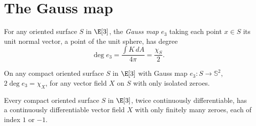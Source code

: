 \section{The Gauss map}
For any oriented surface \(S\) in \(\E[3]\), the \emph{Gauss map} \(e_3\) taking each point \(x \in S\) its unit normal vector, a point of the unit sphere, has degree
\[
\deg e_3 = \frac{\int K \, dA}{4 \pi}=\frac{\chi_S}{2}.
\]
\begin{theorem}
On any compact oriented surface \(S\) in \(\E[3]\) with Gauss map \(e_3 \colon S \to \mathbb{S}^2\), \(2 \deg e_3 = \chi_X\), for any vector field \(X\) on \(S\) with only isolated zeroes.
\end{theorem}
\begin{theorem}\label{theorem:exists.decent.vf}
Every compact oriented surface \(S\) in \(\E[3]\), twice continuously differentiable, has a continuously differentiable vector field \(X\) with only finitely many zeroes, each of index \(1\) or \(-1\).
\end{theorem}
